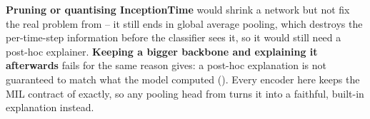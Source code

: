 \textbf{Pruning or quantising InceptionTime} would shrink a network but not fix the real problem
from  -- it still ends in global average pooling, which destroys the per-time-step
information before the classifier sees it, so it would still need a post-hoc explainer.
\textbf{Keeping a bigger backbone and explaining it afterwards} fails for the same reason \millet{}
gives: a post-hoc explanation is not guaranteed to match what the model computed
(). Every encoder here keeps the MIL contract of 
exactly, so any pooling head from  turns it into a faithful, built-in explanation
instead.
